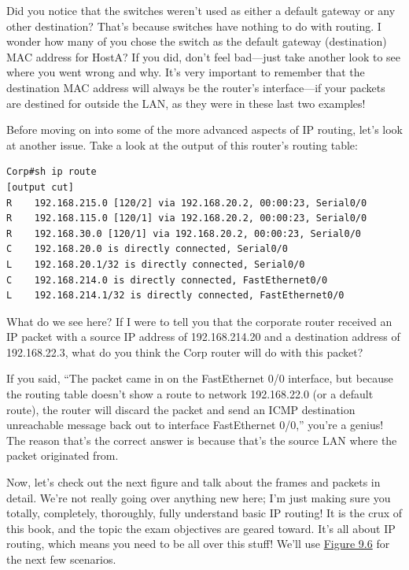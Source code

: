 Did you notice that the switches weren't used as either a default
gateway or any other destination? That's because switches have nothing
to do with routing. I wonder how many of you chose the switch as the
default gateway (destination) MAC address for HostA? If you did, don't
feel bad---just take another look to see where you went wrong and why.
It's very important to remember that the destination MAC address will
always be the router's interface---if your packets are destined for
outside the LAN, as they were in these last two examples!

Before moving on into some of the more advanced aspects of IP routing,
let's look at another issue. Take a look at the output of this router's
routing table:

\begin{verbatim}
Corp#sh ip route
[output cut]
R    192.168.215.0 [120/2] via 192.168.20.2, 00:00:23, Serial0/0
R    192.168.115.0 [120/1] via 192.168.20.2, 00:00:23, Serial0/0
R    192.168.30.0 [120/1] via 192.168.20.2, 00:00:23, Serial0/0
C    192.168.20.0 is directly connected, Serial0/0
L    192.168.20.1/32 is directly connected, Serial0/0
C    192.168.214.0 is directly connected, FastEthernet0/0
L    192.168.214.1/32 is directly connected, FastEthernet0/0
\end{verbatim}

What do we see here? If I were to tell you that the corporate router
received an IP packet with a source IP address of 192.168.214.20 and a
destination address of 192.168.22.3, what do you think the Corp router
will do with this packet?

If you said, ``The packet came in on the FastEthernet 0/0 interface, but
because the routing table doesn't show a route to network 192.168.22.0
(or a default route), the router will discard the packet and send an
ICMP destination unreachable message back out to interface FastEthernet
0/0,'' you're a genius! The reason that's the correct answer is because
that's the source LAN where the packet originated from.

Now, let's check out the next figure and talk about the frames and
packets in detail. We're not really going over anything new here; I'm
just making sure you totally, completely, thoroughly, fully understand
basic IP routing! It is the crux of this book, and the topic the exam
objectives are geared toward. It's all about IP routing, which means you
need to be all over this stuff! We'll use
\protect\hyperlink{c09.xhtmlux5cux23figure9-6}{Figure 9.6} for the next
few scenarios.

